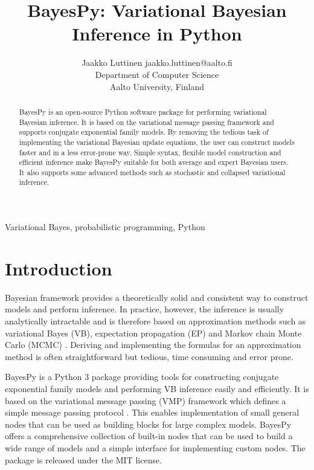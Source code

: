 \documentclass[twoside,11pt]{article}
\begin{document}
\title{BayesPy: Variational Bayesian Inference in Python}

\author{\name Jaakko Luttinen \email jaakko.luttinen@aalto.fi \\
       \addr Department of Computer Science\\
       Aalto University, Finland}


\maketitle

\begin{abstract}%
  BayesPy is an open-source Python software package for performing variational
  Bayesian inference.  It is based on the variational message passing framework
  and supports conjugate exponential family models.  By removing the tedious
  task of implementing the variational Bayesian update equations, the user can
  construct models faster and in a less error-prone way.  Simple syntax,
  flexible model construction and efficient inference make BayesPy suitable for
  both average and expert Bayesian users.  It also supports some advanced
  methods such as stochastic and collapsed variational inference.
\end{abstract}

\begin{keywords}
  Variational Bayes, probabilistic programming,
  Python
\end{keywords}

\section{Introduction}

Bayesian framework provides a theoretically solid and consistent way to
construct models and perform inference.  In practice, however, the inference is
usually analytically intractable and is therefore based on approximation methods
such as variational Bayes (VB), expectation propagation (EP) and Markov chain
Monte Carlo (MCMC) \citep{Bishop:2006}.  Deriving and implementing the formulas
for an approximation method is often straightforward but tedious, time consuming
and error prone.


BayesPy is a Python 3 package providing tools for constructing conjugate
exponential family models and performing VB inference easily and efficiently.
It is based on the variational message passing (VMP) framework which defines a
simple message passing protocol \citep{Winn:2005}.  This enables implementation
of small general nodes that can be used as building blocks for large complex
models.  BayesPy offers a comprehensive collection of built-in nodes that can be
used to build a wide range of models and a simple interface for implementing
custom nodes.  The package is released under the MIT license.
\end{document}
